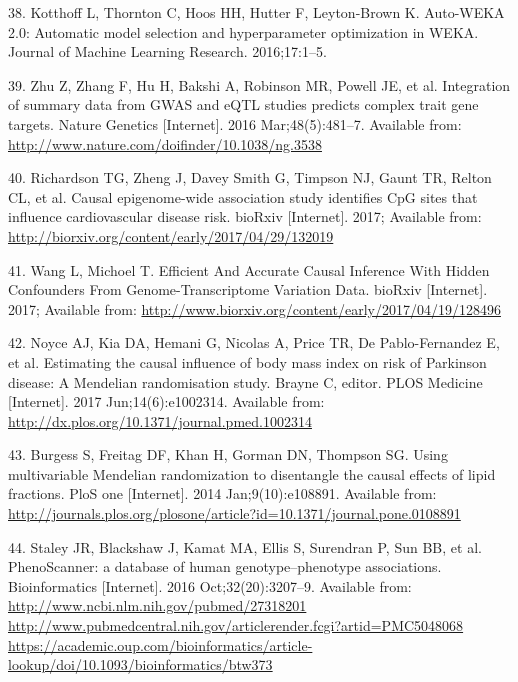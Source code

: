 \documentclass[]{article}
\begin{document}
\hypertarget{ref-kotthoff2016auto}{}
38. Kotthoff L, Thornton C, Hoos HH, Hutter F, Leyton-Brown K. Auto-WEKA
2.0: Automatic model selection and hyperparameter optimization in WEKA.
Journal of Machine Learning Research. 2016;17:1--5.

\hypertarget{ref-Zhu2016}{}
39. Zhu Z, Zhang F, Hu H, Bakshi A, Robinson MR, Powell JE, et al.
Integration of summary data from GWAS and eQTL studies predicts complex
trait gene targets. Nature Genetics {[}Internet{]}. 2016
Mar;48(5):481--7. Available from:
\url{http://www.nature.com/doifinder/10.1038/ng.3538}

\hypertarget{ref-Richardson2017}{}
40. Richardson TG, Zheng J, Davey Smith G, Timpson NJ, Gaunt TR, Relton
CL, et al. Causal epigenome-wide association study identifies CpG sites
that influence cardiovascular disease risk. bioRxiv {[}Internet{]}.
2017; Available from:
\url{http://biorxiv.org/content/early/2017/04/29/132019}

\hypertarget{ref-Wang2017}{}
41. Wang L, Michoel T. Efficient And Accurate Causal Inference With
Hidden Confounders From Genome-Transcriptome Variation Data. bioRxiv
{[}Internet{]}. 2017; Available from:
\url{http://www.biorxiv.org/content/early/2017/04/19/128496}

\hypertarget{ref-Noyce2017}{}
42. Noyce AJ, Kia DA, Hemani G, Nicolas A, Price TR, De Pablo-Fernandez
E, et al. Estimating the causal influence of body mass index on risk of
Parkinson disease: A Mendelian randomisation study. Brayne C, editor.
PLOS Medicine {[}Internet{]}. 2017 Jun;14(6):e1002314. Available from:
\url{http://dx.plos.org/10.1371/journal.pmed.1002314}

\hypertarget{ref-Burgess2014a}{}
43. Burgess S, Freitag DF, Khan H, Gorman DN, Thompson SG. Using
multivariable Mendelian randomization to disentangle the causal effects
of lipid fractions. PloS one {[}Internet{]}. 2014 Jan;9(10):e108891.
Available from:
\url{http://journals.plos.org/plosone/article?id=10.1371/journal.pone.0108891}

\hypertarget{ref-Staley2016}{}
44. Staley JR, Blackshaw J, Kamat MA, Ellis S, Surendran P, Sun BB, et
al. PhenoScanner: a database of human genotype--phenotype associations.
Bioinformatics {[}Internet{]}. 2016 Oct;32(20):3207--9. Available from:
\href{http://www.ncbi.nlm.nih.gov/pubmed/27318201\%20http://www.pubmedcentral.nih.gov/articlerender.fcgi?artid=PMC5048068\%20https://academic.oup.com/bioinformatics/article-lookup/doi/10.1093/bioinformatics/btw373}{http://www.ncbi.nlm.nih.gov/pubmed/27318201 http://www.pubmedcentral.nih.gov/articlerender.fcgi?artid=PMC5048068 https://academic.oup.com/bioinformatics/article-lookup/doi/10.1093/bioinformatics/btw373}
\end{document}
